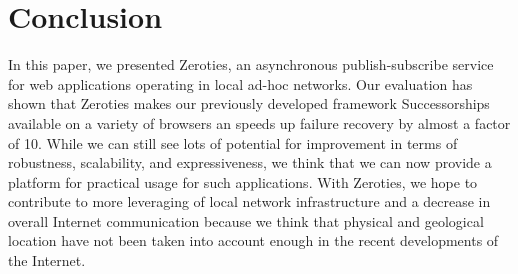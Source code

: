 \section{Conclusion}
\label{sec:conclusion}

In this paper, we presented Zeroties, an asynchronous publish-subscribe service for web applications operating in local ad-hoc networks. 
Our evaluation has shown that Zeroties makes our previously developed framework Successorships available on a variety of browsers an speeds up failure recovery by almost a factor of 10.
While we can still see lots of potential for improvement in terms of robustness, scalability, and expressiveness, we think that we can now provide a platform for practical usage for such applications.
With Zeroties, we hope to contribute to more leveraging of local network infrastructure and a decrease in overall Internet communication because we think that physical and geological location have not been taken into account enough in the recent developments of the Internet.